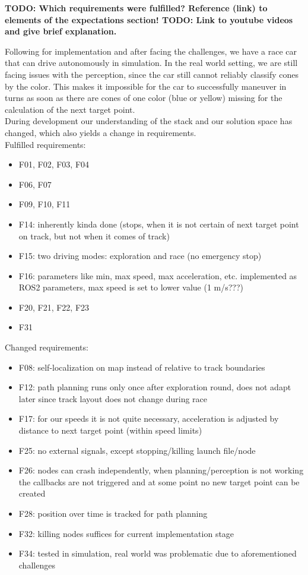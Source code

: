\textbf{TODO: Which requirements were fulfilled? Reference (link) to elements of the expectations section! TODO: Link to youtube videos and give brief explanation.}

Following for implementation and after facing the challenges, we have a race car that can drive autonomously in simulation. In the real world setting, we are still facing issues with the perception, since the car still cannot reliably classify cones by the color. This makes it impossible for the car to successfully maneuver in turns as soon as there are cones of one color (blue or yellow) missing for the calculation of the next target point. \\
During development our understanding of the stack and our solution space has changed, which also yields a change in requirements. \\

Fulfilled requirements:
\begin{itemize}
	\item F01, F02, F03, F04
	\item F06, F07
	\item F09, F10, F11
	\item F14: inherently kinda done (stops, when it is not certain of next target point on track, but not when it comes of track)
	\item F15: two driving modes: exploration and race (no emergency stop)
	\item F16: parameters like min, max speed, max acceleration, etc. implemented as ROS2 parameters, max speed is set to lower value (1 m/s???)
	\item F20, F21, F22, F23
	\item F31
\end{itemize}

Changed requirements:
\begin{itemize}
	\item F08: self-localization on map instead of relative to track boundaries
	\item F12: path planning runs only once after exploration round, does not adapt later since track layout does not change during race
	\item F17: for our speeds it is not quite necessary, acceleration is adjusted by distance to next target point (within speed limits)
	\item F25: no external signals, except stopping/killing launch file/node
	\item F26: nodes can crash independently, when planning/perception is not working the callbacks are not triggered and at some point no new target point can be created
	\item F28: position over time is tracked for path planning
	\item F32: killing nodes suffices for current implementation stage
	\item F34: tested in simulation, real world was problematic due to aforementioned challenges
\end{itemize}

